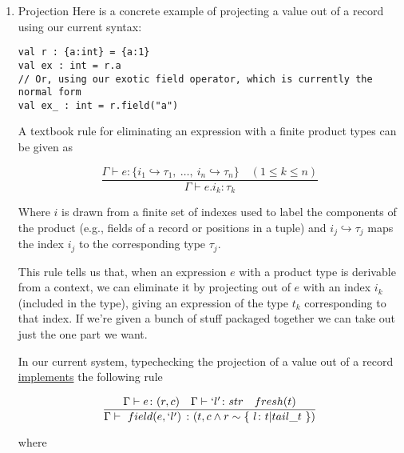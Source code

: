 \documentclass[11pt]{article}
\begin{document}
\begin{enumerate}
\item Projection
\label{sec:orgc385f63}
Here is a concrete example of projecting a value out of a record using
our current syntax:

\begin{verbatim}
val r : {a:int} = {a:1}
val ex : int = r.a
// Or, using our exotic field operator, which is currently the normal form
val ex_ : int = r.field("a")
\end{verbatim}

A textbook rule for eliminating an expression with a finite product
types can be given as

$$
\frac
{ \Gamma \vdash e \colon \{ i_1 \hookrightarrow \tau_1, \ \ldots, \ i_n \hookrightarrow \tau_n \} \quad (1 \le k \le n)}
{ \Gamma \vdash e.i_k \colon \tau_k }
$$

Where \(i\) is drawn from a finite set of indexes used to label the
components of the product (e.g., fields of a record or positions in a
tuple) and \(i_j \hookrightarrow \tau_j\) maps the index \(i_j\) to the
corresponding type \(\tau_j\).

This rule tells us that, when an expression \(e\) with a product type is
derivable from a context, we can eliminate it by projecting out of \(e\)
with an index \(i_k\) (included in the type), giving an expression of
the type \(t_k\) corresponding to that index. If we're given a bunch of
stuff packaged together we can take out just the one part we want.

In our current system, typechecking the projection of a value out of a record
\href{https://github.com/informalsystems/quint/blob/545b14fb8c19ac71d8f08fb8500ce9cc3cabf678/quint/src/types/specialConstraints.ts\#L91-L120}{implements} the following rule

$$
\frac
{ \Gamma \vdash e \colon (r, c) \quad \Gamma \vdash `l' \colon str \quad fresh(t) }
{ \Gamma \vdash \ field(e, `l') \ \colon (t, c \land r \sim \{ \ l \colon t | tail\_t \ \}) }
$$

where


\end{enumerate}
\end{document}
